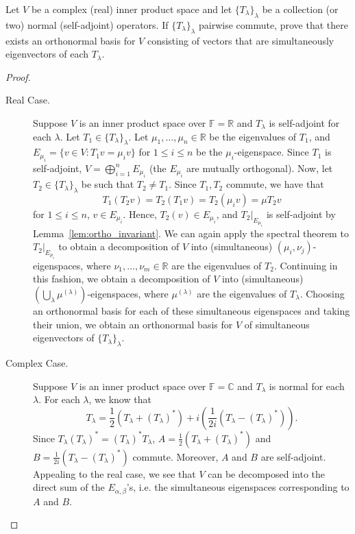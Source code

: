 \documentclass{article}
\begin{document}
\begin{problem}
Let \(V\) be a complex (real) inner product space and let
\(\{T_\lambda\}_\lambda\) be a collection (or two) normal (self-adjoint)
operators. If \(\{T_\lambda\}_\lambda\) pairwise commute, prove that there
exists an orthonormal basis for \(V\) consisting of vectors that are
simultaneously eigenvectors of each \(T_\lambda\).
\end{problem}
\begin{proof}\leavevmode
	\begin{description}
		\item[Real Case.]  Suppose \(V\) is an inner product space over
			\(\mathbb{F} = \mathbb{R}\) and \(T_\lambda\) is self-adjoint for each
			\(\lambda\).  Let \(T_1\in \{T_\lambda\}_\lambda\).  Let \(\mu_1, \ldots,
			\mu_n\in \mathbb{R}\) be the eigenvalues of \(T_1\), and \(E_{\mu_i} =
			\{v\in V : T_1 v = \mu_i v\}\) for \(1\leq i\leq n\) be the
			\(\mu_i\)-eigenspace.  Since \(T_1\) is self-adjoint, \(V =
			\bigoplus_{i=1}^n E_{\mu_i}\) (the \(E_{\mu_i}\) are mutually
			orthogonal).  Now, let \(T_2\in \{T_\lambda\}_\lambda\) be such that
			\(T_2\neq T_1\).  Since \(T_1, T_2\) commute, we have that
			\[
				T_1 (T_2 v) = T_2 (T_1 v) = T_2 (\mu_i v) = \mu T_2 v
			\]
			for \(1\leq i\leq n\), \(v\in E_{\mu_i}\).  Hence, \(T_2(v)\in E_{\mu_i}\),
			and \(T_2|_{E_{\mu_i}}\) is self-adjoint by
			Lemma~\ref{lem:ortho_invariant}.  We can again apply the spectral theorem
			to \(T_2|_{E_{\mu_i}}\) to obtain a decomposition of \(V\) into
			(simultaneous) \((\mu_i, \nu_j)\)-eigenspaces, where \(\nu_1, \ldots,
			\nu_m\in \mathbb{R}\) are the eigenvalues of \(T_2\).  Continuing in this
			fashion, we obtain a decomposition of \(V\) into (simultaneous)
			\(\left(\bigcup_{\lambda} \mu^{(\lambda)}\right)\)-eigenspaces, where
			\(\mu^{(\lambda)}\) are the eigenvalues of \(T_\lambda\).  Choosing an
			orthonormal basis for each of these simultaneous eigenspaces and taking
			their union, we obtain an orthonormal basis for \(V\) of simultaneous
			eigenvectors of \(\{T_\lambda\}_\lambda\).
		\item[Complex Case.]  Suppose \(V\) is an inner product space over
			\(\mathbb{F} = \mathbb{C}\) and \(T_\lambda\) is normal for each
			\(\lambda\).  For each \(\lambda\), we know that
			\[
				T_\lambda = \frac{1}{2}(T_\lambda+(T_\lambda)^*) + i \left( \frac{1}{2i} \left(T_\lambda-(T_\lambda)^*\right) \right)
				.\]
			Since \(T_\lambda (T_\lambda)^* = (T_\lambda)^* T_\lambda\), \(A =
			\frac{1}{2}(T_\lambda+(T_\lambda)^*)\) and \(B =
			\frac{1}{2i}\left(T_\lambda-(T_\lambda)^*\right)\) commute. Moreover,
			\(A\) and \(B\) are self-adjoint.  Appealing to the real case, we see
			that \(V\) can be decomposed into the direct sum of the
			\(E_{\alpha, \beta}\)'s, i.e. the simultaneous eigenspaces corresponding
			to \(A\) and \(B\).
	\end{description}
\end{proof}
\end{document}
